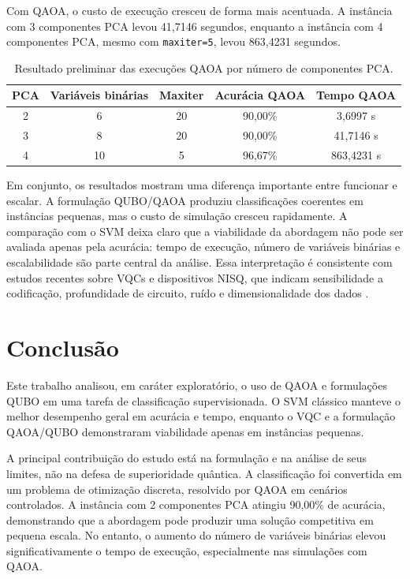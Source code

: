 \documentclass[12pt]{unisenaiclass}
\begin{document}
Com QAOA, o custo de execução cresceu de forma mais acentuada. A instância com 3 componentes PCA levou 41,7146 segundos, enquanto a instância com 4 componentes PCA, mesmo com \texttt{maxiter=5}, levou 863,4231 segundos.

\begin{table}[H]
    \centering
    \caption{Resultado preliminar das execuções QAOA por número de componentes PCA.}
    \label{tab:qaoa-pca}
    \begin{tabular}{ccccc}
        \toprule
        PCA & Variáveis binárias & Maxiter & Acurácia QAOA & Tempo QAOA \\
        \midrule
        2 & 6  & 20 & 90,00\% & 3,6997 s \\
        3 & 8  & 20 & 90,00\% & 41,7146 s \\
        4 & 10 & 5  & 96,67\% & 863,4231 s \\
        \bottomrule
    \end{tabular}
\end{table}

Em conjunto, os resultados mostram uma diferença importante entre funcionar e escalar. A formulação QUBO/QAOA produziu classificações coerentes em instâncias pequenas, mas o custo de simulação cresceu rapidamente. A comparação com o SVM deixa claro que a viabilidade da abordagem não pode ser avaliada apenas pela acurácia: tempo de execução, número de variáveis binárias e escalabilidade são parte central da análise. Essa interpretação é consistente com estudos recentes sobre VQCs e dispositivos NISQ, que indicam sensibilidade a codificação, profundidade de circuito, ruído e dimensionalidade dos dados \cite{qi2025hevqc,park2026vqcsensitivity,singh2026quantumarithmetic}.

\clearpage

\section{Conclusão}
Este trabalho analisou, em caráter exploratório, o uso de QAOA e formulações QUBO em uma tarefa de classificação supervisionada. O SVM clássico manteve o melhor desempenho geral em acurácia e tempo, enquanto o VQC e a formulação QAOA/QUBO demonstraram viabilidade apenas em instâncias pequenas.

A principal contribuição do estudo está na formulação e na análise de seus limites, não na defesa de superioridade quântica. A classificação foi convertida em um problema de otimização discreta, resolvido por QAOA em cenários controlados. A instância com 2 componentes PCA atingiu 90,00\% de acurácia, demonstrando que a abordagem pode produzir uma solução competitiva em pequena escala. No entanto, o aumento do número de variáveis binárias elevou significativamente o tempo de execução, especialmente nas simulações com QAOA.
\end{document}
